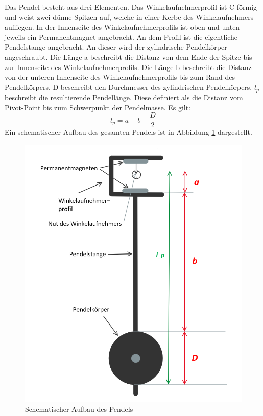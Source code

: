 Das Pendel besteht aus drei Elementen. Das Winkelaufnehmerprofil ist C-förmig und weist zwei dünne Spitzen auf, welche in einer Kerbe des Winkelaufnehmers aufliegen. In der Innenseite des Winkelaufnehmerprofils ist oben und unten jeweils ein Permanentmagnet angebracht. An dem Profil ist die eigentliche Pendelstange angebracht. An dieser wird der zylindrische Pendelkörper angeschraubt. Die Länge a beschreibt die Distanz von dem Ende der Spitze bis zur Innenseite des Winkelaufnehmerprofils. Die Länge b beschreibt die Distanz von der unteren Innenseite des Winkelaufnehmerprofils bis zum Rand des Pendelkörpers. D beschreibt den Durchmesser des zylindrischen Pendelkörpers. $l_p$ beschreibt die resultierende Pendellänge. Diese definiert als die Distanz vom Pivot-Point bis zum Schwerpunkt der Pendelmasse. Es gilt:
\[l_p = a +b+ \frac{D}{2}\]
Ein schematischer Aufbau des gesamten Pendels ist in Abbildung \ref{fig:aufbau_pendel} dargestellt. \\
\begin{figure}[H]
	\centering
	\includegraphics[width=1\textwidth]{aufbau_pendel.png}
	\caption{Schematischer Aufbau des Pendels}
	\label{fig:aufbau_pendel}
\end{figure}
